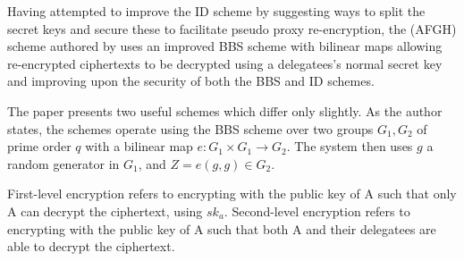 Having attempted to improve the ID scheme by suggesting ways to split the secret keys and secure these to facilitate pseudo proxy re-encryption, the (AFGH) scheme authored by \cite{afgh:2006:article} uses an improved BBS scheme with bilinear maps allowing re-encrypted ciphertexts to be decrypted using a delegatees's normal secret key and improving upon the security of both the BBS and ID schemes.

The paper presents two useful schemes which differ only slightly. As the author states, the schemes operate using the BBS scheme over two groups $G_1, G_2$ of prime order $q$ with a bilinear map $e : G_1 \times G_1 \rightarrow G_2$. The system then uses $g$ a random generator in $G_1$, and $Z = e(g, g) \in G_2$.

First-level encryption refers to encrypting with the public key of A such that only A can decrypt the ciphertext, using $sk_a$. Second-level encryption refers to encrypting with the public key of A such that both A and their delegatees are able to decrypt the ciphertext.

